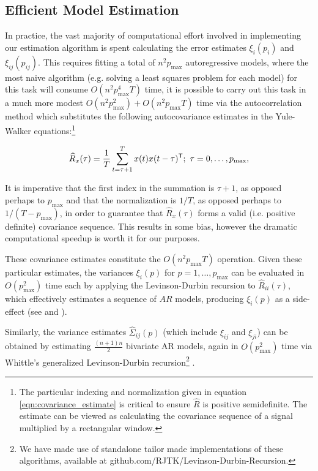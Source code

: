 \documentclass[12pt]{article}
\begin{document}
\subsection{Efficient Model Estimation}
\label{sec:efficient_model_estimation}
In practice, the vast majority of computational effort involved in
implementing our estimation algorithm is spent calculating the error
estimates $\xi_i(p_i)$ and $\xi_{ij}(p_{ij})$.  This requires fitting a
total of $n^2p_{\text{max}}$ autoregressive models, where the most
naive algorithm (e.g. solving a least squares problem for each model)
for this task will consume $O(n^2p_{\text{max}}^4T)$ time, it is
possible to carry out this task in a much more modest
$O(n^2p_{\text{max}}^2 ) + O(n^2p_{\text{max}}T)$ time via the
autocorrelation method
\cite{hayes_statistical_digital_signal_processing} which substitutes
the following autocovariance estimates in the Yule-Walker
equations:\footnote{The particular indexing and normalization given in
  equation \ref{eqn:covariance_estimate} is critical to ensure
  $\widehat{R}$ is positive semidefinite.  The estimate can be viewed
  as calculating the covariance sequence of a signal multiplied by a
  rectangular window.}

\begin{equation}
  \label{eqn:covariance_estimate}
  \widehat{R}_x(\tau) = \frac{1}{T}\sum_{t = \tau + 1}^T x(t) x(t - \tau)^{\mathsf{T}};\ \tau = 0, \ldots, p_{\text{max}},
\end{equation}

It is imperative that the first index in the summation is $\tau + 1$, as
opposed perhaps to $p_\text{max}$ and that the normalization is
$1 / T$, as opposed perhaps to $1 / (T - p_\text{max})$, in order to
guarantee that $\widehat{R}_x(\tau)$ forms a valid (i.e. positive
definite) covariance sequence.  This results in some bias, however the
dramatic computational speedup is worth it for our purposes.

These covariance estimates constitute the $O(n^2p_{\text{max}}T)$
operation.  Given these particular estimates, the variances $\xi_i(p)$
for $p = 1, \ldots, p_{\text{max}}$ can be evaluated in
$O(p_{\text{max}}^2)$ time each by applying the Levinson-Durbin
recursion to $\widehat{R}_{ii}(\tau)$, which effectively estimates a
sequence of $AR$ models, producing $\xi_i(p)$ as a side-effect (see
\cite{hayes_statistical_digital_signal_processing} and
\cite{levinson_durbin_recursion}).

Similarly, the variance estimates $\widehat{\Sigma}_{ij}(p)$ (which
include $\xi_{ij}$ and $\xi_{ji}$) can be obtained by estimating
$\frac{(n + 1)n}{2}$ bivariate AR models, again in
$O(p_{\text{max}}^2)$ time via Whittle's generalized Levinson-Durbin
recursion\footnote{We have made use of standalone tailor made
  implementations of these algorithms, available at
  \textsf{github.com/RJTK/Levinson-Durbin-Recursion}.}
\cite{whittle_generalized_levinson_durbin}.
\end{document}
